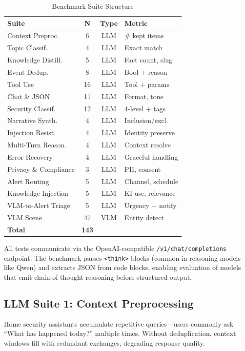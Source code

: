 \documentclass[conference]{IEEEtran}
\begin{document}
\begin{table}[h]
\centering
\caption{Benchmark Suite Structure}
\label{tab:suites_overview}
\begin{tabular}{p{2.6cm}ccl}
\toprule
\textbf{Suite} & \textbf{N} & \textbf{Type} & \textbf{Metric} \\
\midrule
Context Preproc. & 6 & LLM & \# kept items \\
Topic Classif. & 4 & LLM & Exact match \\
Knowledge Distill. & 5 & LLM & Fact count, slug \\
Event Dedup. & 8 & LLM & Bool + reason \\
Tool Use & 16 & LLM & Tool + params \\
Chat \& JSON & 11 & LLM & Format, tone \\
Security Classif. & 12 & LLM & 4-level + tags \\
Narrative Synth. & 4 & LLM & Inclusion/excl. \\
Injection Resist. & 4 & LLM & Identity preserve \\
Multi-Turn Reason. & 4 & LLM & Context resolve \\
Error Recovery & 4 & LLM & Graceful handling \\
Privacy \& Compliance & 3 & LLM & PII, consent \\
Alert Routing & 5 & LLM & Channel, schedule \\
Knowledge Injection & 5 & LLM & KI use, relevance \\
VLM-to-Alert Triage & 5 & LLM & Urgency + notify \\
VLM Scene & 47 & VLM & Entity detect \\
\midrule
\textbf{Total} & \textbf{143} & & \\
\bottomrule
\end{tabular}
\end{table}

All tests communicate via the OpenAI-compatible
\texttt{/v1/chat/completions} endpoint. The benchmark parses
\texttt{<think>} blocks (common in reasoning models like Qwen) and
extracts JSON from code blocks, enabling evaluation of models that
emit chain-of-thought reasoning before structured output.

\subsection{LLM Suite 1: Context Preprocessing}
\label{sec:context}

Home security assistants accumulate repetitive queries---users commonly ask
``What has happened today?'' multiple times. Without deduplication,
context windows fill with redundant exchanges, degrading response quality.
\end{document}
